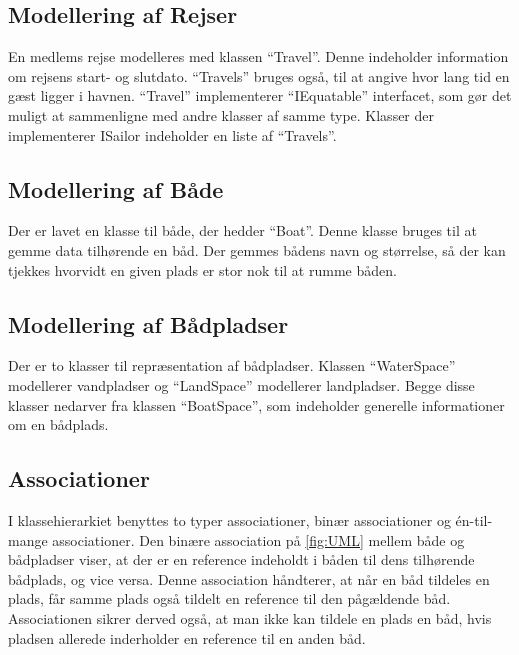  
\subsection{Modellering af Rejser}
\label{sub:rejser}

En medlems rejse modelleres med klassen \enquote{Travel}. Denne indeholder information om rejsens start- og slutdato. \enquote{Travels} bruges også, til at angive hvor lang tid en gæst ligger i havnen. \enquote{Travel} implementerer \enquote{IEquatable} interfacet, som gør det muligt at sammenligne med andre klasser af samme type. Klasser der implementerer ISailor indeholder en liste af \enquote{Travels}.
 
\subsection{Modellering af Både}
\label{sub:bade}

Der er lavet en klasse til både, der hedder \enquote{Boat}. Denne klasse bruges til at gemme data tilhørende en båd. Der gemmes bådens navn og størrelse, så der kan tjekkes hvorvidt en given plads er stor nok til at rumme båden.

\subsection{Modellering af Bådpladser}
\label{sub:pladser}

Der er to klasser til repræsentation af bådpladser. Klassen \enquote{WaterSpace} modellerer vandpladser og \enquote{LandSpace} modellerer landpladser. Begge disse klasser nedarver fra klassen \enquote{BoatSpace}, som indeholder generelle informationer om en bådplads. 

\subsection{Associationer}
\label{sub:associationer}

I klassehierarkiet benyttes to typer associationer, binær associationer og én-til-mange associationer. Den binære association på \cref{fig:UML} mellem både og bådpladser viser, at der er en reference indeholdt i båden til dens tilhørende bådplads, og vice versa. Denne association håndterer, at når en båd tildeles en plads, får samme plads også tildelt en reference til den pågældende båd. Associationen sikrer derved også, at man ikke kan tildele en plads en båd, hvis pladsen allerede inderholder en reference til en anden båd. 

